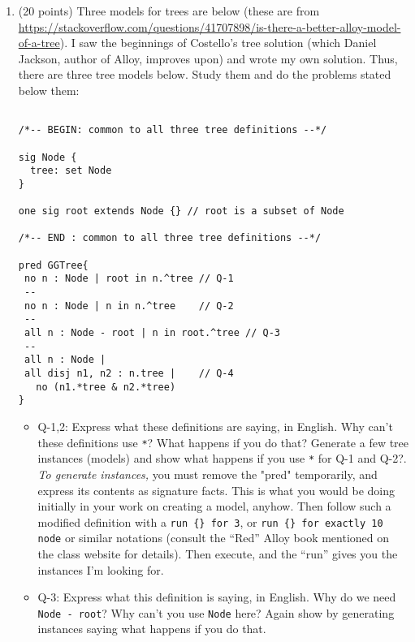 \documentclass[11pt]{article}
\begin{document}
\begin{enumerate}
  
\item (20 points) Three models for trees are below (these
  are from
  \url{https://stackoverflow.com/questions/41707898/is-there-a-better-alloy-model-of-a-tree}).
  I saw the beginnings of Costello's tree solution (which Daniel Jackson, author of Alloy, improves upon) and wrote
  my own solution.
  Thus, there are three tree models below.
  Study them and do the problems stated below them:
  \begin{scriptsize}
\begin{verbatim}

/*-- BEGIN: common to all three tree definitions --*/

sig Node {
  tree: set Node
}

one sig root extends Node {} // root is a subset of Node

/*-- END : common to all three tree definitions --*/

pred GGTree{
 no n : Node | root in n.^tree // Q-1
 --
 no n : Node | n in n.^tree    // Q-2
 --
 all n : Node - root | n in root.^tree // Q-3
 -- 
 all n : Node |
 all disj n1, n2 : n.tree |    // Q-4
   no (n1.*tree & n2.*tree) 
}
  \end{verbatim}
  \end{scriptsize}

\begin{itemize}
\item[] Q-1,2: Express what these definitions are saying, in English.
Why can't these definitions use \verb|*|? What happens if you do that?
 Generate
a few tree instances (models) and show what happens if you use \verb|*| for Q-1 and Q-2?.
%
{\em To generate instances,} you must remove the "pred" temporarily, and express its
contents as signature facts.
This is what you would be doing initially in your work on creating a model, anyhow.
Then follow such a modified definition with a
\verb|run {} for 3|,
or
\verb|run {} for exactly 10 node|
or
similar notations (consult the ``Red'' Alloy book mentioned on the class website for details).
Then execute, and the ``run'' gives you the instances I'm looking for.

\item[] Q-3: Express what this definition is saying, in English.
Why do we need \verb|Node - root|? Why can't you use \verb|Node| here?
Again show by generating instances saying what happens if you do that.


\end{itemize}
\end{enumerate}
\end{document}
